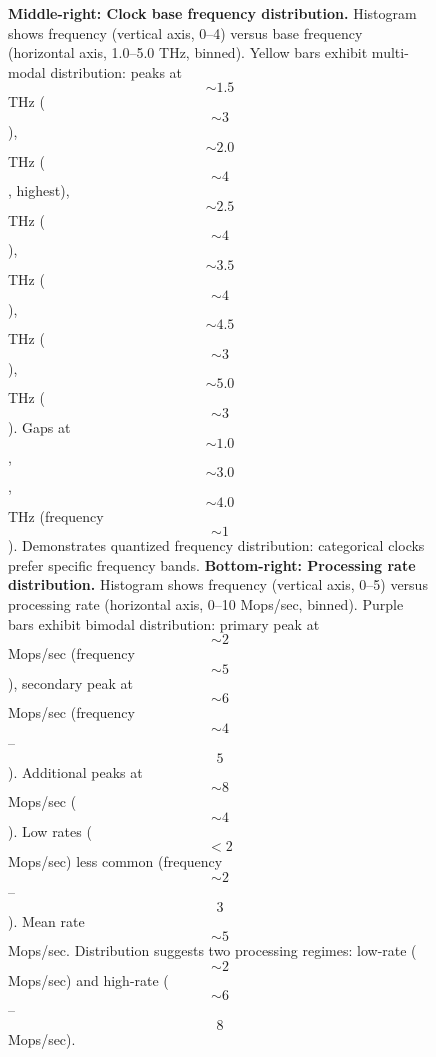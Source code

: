 \begin{figure}[htbp]
{      \textbf{Middle-right: Clock base frequency distribution.} Histogram shows frequency (vertical axis, 0--4) versus base frequency (horizontal axis, 1.0--5.0 THz, binned). Yellow bars exhibit multi-modal distribution: peaks at $$\sim 1.5$$ THz ($$\sim 3$$), $$\sim 2.0$$ THz ($$\sim 4$$, highest), $$\sim 2.5$$ THz ($$\sim 4$$), $$\sim 3.5$$ THz ($$\sim 4$$), $$\sim 4.5$$ THz ($$\sim 3$$), $$\sim 5.0$$ THz ($$\sim 3$$). Gaps at $$\sim 1.0$$, $$\sim 3.0$$, $$\sim 4.0$$ THz (frequency $$\sim 1$$). Demonstrates quantized frequency distribution: categorical clocks prefer specific frequency bands. 
      \textbf{Bottom-right: Processing rate distribution.} Histogram shows frequency (vertical axis, 0--5) versus processing rate (horizontal axis, 0--10 Mops/sec, binned). Purple bars exhibit bimodal distribution: primary peak at $$\sim 2$$ Mops/sec (frequency $$\sim 5$$), secondary peak at $$\sim 6$$ Mops/sec (frequency $$\sim 4$$--$$5$$). Additional peaks at $$\sim 8$$ Mops/sec ($$\sim 4$$). Low rates ($$< 2$$ Mops/sec) less common (frequency $$\sim 2$$--$$3$$). Mean rate $$\sim 5$$ Mops/sec. Distribution suggests two processing regimes: low-rate ($$\sim 2$$ Mops/sec) and high-rate ($$\sim 6$$--$$8$$ Mops/sec).}
      \label{fig:molecular_properties_overview}
      \end{figure}

